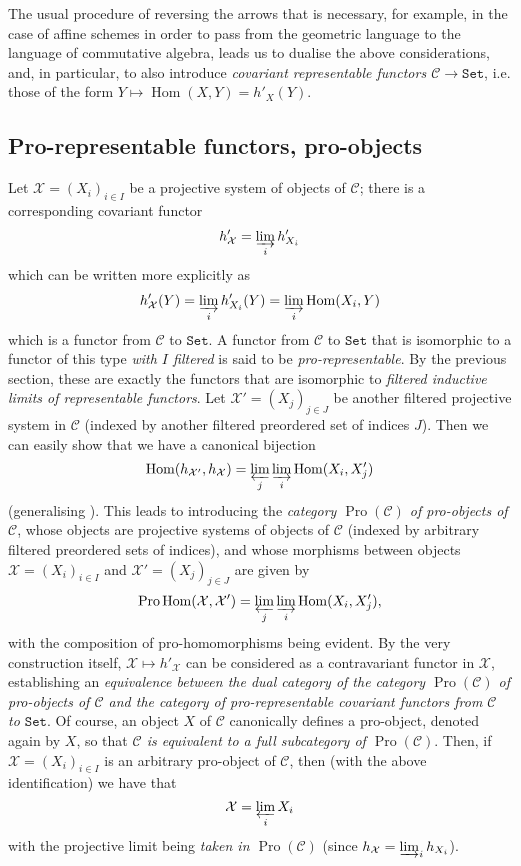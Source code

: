 The usual procedure of reversing the arrows that is necessary, for example, in the case of affine schemes in order to pass from the geometric language to the language of commutative algebra, leads us to dualise the above considerations, and, in particular, to also introduce \emph{covariant representable functors $\mathcal{C}\to\mathtt{Set}$}, i.e. those of the form $Y\mapsto\operatorname{Hom}(X,Y)=h'_X(Y)$.


\subsection{Pro-representable functors, pro-objects}\label{fga3.ii-a.2}

Let $\mathcal{X}=(X_i)_{i\in I}$ be a projective system of objects of $\mathcal{C}$;
there is a corresponding covariant functor
\[
    h'_{\mathcal{X}}
    = \varinjlim_i h'_{X_i}
\]
which can be written more explicitly as
\[
    h'_{\mathcal{X}}(Y)
    = \varinjlim_i h'_{X_i}(Y)
    = \varinjlim_i\operatorname{Hom}(X_i,Y)
\]
which is a functor from $\mathcal{C}$ to $\mathtt{Set}$.
A functor from $\mathcal{C}$ to $\mathtt{Set}$ that is isomorphic to a functor of this type \emph{with $I$ filtered} is said to be \emph{pro-representable}.
By the previous section, these are exactly the functors that are isomorphic to \emph{filtered inductive limits of representable functors}.
Let $\mathcal{X}'=(X_j)_{j\in J}$ be another filtered projective system in $\mathcal{C}$ (indexed by another filtered preordered set of indices $J$).
Then we can easily show that we have a canonical bijection
\[
    \operatorname{Hom}(h_{\mathcal{X}'},h_{\mathcal{X}})
    = \varprojlim_j\varinjlim_i\operatorname{Hom}(X_i,X'_j)
\]
(generalising ).
This leads to introducing the \emph{category $\operatorname{Pro}(\mathcal{C})$ of pro-objects of $\mathcal{C}$}, whose objects are projective systems of objects of $\mathcal{C}$ (indexed by arbitrary filtered preordered sets of indices), and whose morphisms between objects $\mathcal{X}=(X_i)_{i\in I}$ and $\mathcal{X}'=(X_j)_{j\in J}$ are given by
\[
    \operatorname{Pro}\operatorname{Hom}(\mathcal{X},\mathcal{X}')
    = \varprojlim_j\varinjlim_i\operatorname{Hom}(X_i,X'_j),
\]
with the composition of pro-homomorphisms being evident.
By the very construction itself, $\mathcal{X}\mapsto h'_{\mathcal{X}}$ can be considered as a contravariant functor in $\mathcal{X}$, establishing an \emph{equivalence between the dual category of the category $\operatorname{Pro}(\mathcal{C})$ of pro-objects of $\mathcal{C}$ and the category of pro-representable covariant functors from $\mathcal{C}$ to $\mathtt{Set}$}.
Of course, an object $X$ of $\mathcal{C}$ canonically defines a pro-object, denoted again by $X$, so that \emph{$\mathcal{C}$ is equivalent to a full subcategory of $\operatorname{Pro}(\mathcal{C})$}.
Then, if $\mathcal{X}=(X_i)_{i\in I}$ is an arbitrary pro-object of $\mathcal{C}$, then (with the above identification) we have that
\[
    \mathcal{X}
    = \varprojlim_i X_i
\]
with the projective limit being \emph{taken in $\operatorname{Pro}(\mathcal{C})$} (since $h_{\mathcal{X}}=\varinjlim_i h_{X_i}$).


